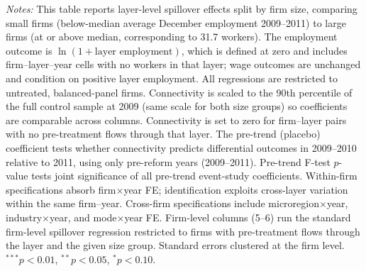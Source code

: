\begin{landscape}
\begin{table}[H]
\begin{minipage}{\linewidth}
\textit{Notes:} This table reports layer-level spillover effects split by firm size, comparing small firms (below-median average December employment 2009--2011) to large firms (at or above median, corresponding to 31.7 workers). The employment outcome is $\ln(1 + \text{layer employment})$, which is defined at zero and includes firm--layer--year cells with no workers in that layer; wage outcomes are unchanged and condition on positive layer employment. All regressions are restricted to untreated, balanced-panel firms. Connectivity is scaled to the 90th percentile of the full control sample at 2009 (same scale for both size groups) so coefficients are comparable across columns. Connectivity is set to zero for firm--layer pairs with no pre-treatment flows through that layer. The pre-trend (placebo) coefficient tests whether connectivity predicts differential outcomes in 2009--2010 relative to 2011, using only pre-reform years (2009--2011). Pre-trend F-test $p$-value tests joint significance of all pre-trend event-study coefficients. Within-firm specifications absorb firm$\times$year FE; identification exploits cross-layer variation within the same firm--year. Cross-firm specifications include microregion$\times$year, industry$\times$year, and mode$\times$year FE. Firm-level columns (5--6) run the standard firm-level spillover regression restricted to firms with pre-treatment flows through the layer and the given size group. Standard errors clustered at the firm level. $^{***}p<0.01$, $^{**}p<0.05$, $^{*}p<0.10$.
\end{minipage}
\end{table}
\end{landscape}